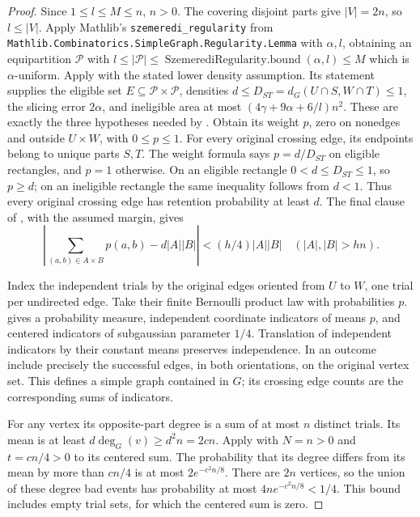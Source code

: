 \begin{proof}
Since $1\leq l\leq M\leq n$, $n>0$. The covering disjoint parts
give $|V|=2n$, so $l\leq|V|$. Apply
Mathlib's \texttt{szemeredi\_regularity} from
\texttt{Mathlib.Combinatorics.SimpleGraph.Regularity.Lemma} with $\alpha,l$, obtaining
an equipartition $\mathcal P$ with
$l\leq|\mathcal P|\leq\operatorname{SzemerediRegularity.bound}(\alpha,l)\leq M$
which is $\alpha$-uniform. Apply
 with the stated lower
density assumption. Its statement supplies the eligible set
$E\subseteq\mathcal P\times\mathcal P$, densities
$d\leq D_{ST}=d_G(U\cap S,W\cap T)\leq1$, the slicing error
$2\alpha$, and ineligible area at most $(4\gamma+9\alpha+6/l)n^2$.
These are exactly the three hypotheses needed by
. Obtain its weight $p$, zero
on nonedges and outside $U\times W$, with $0\leq p\leq1$.
For every original crossing edge, its endpoints belong to unique
parts $S,T$. The weight formula says $p=d/D_{ST}$ on eligible
rectangles, and $p=1$ otherwise. On an eligible rectangle
$0<d\leq D_{ST}\leq1$, so $p\geq d$; on an ineligible rectangle
the same inequality follows from $d<1$. Thus every original
crossing edge has retention probability at least $d$.
The final clause of , with
the assumed margin, gives
\[
\left|\sum_{(a,b)\in A\times B}p(a,b)-d|A||B|\right|
<(h/4)|A||B|\quad (|A|,|B|>hn).                 \tag{1}
\]

Index the independent trials by the original edges oriented from
$U$ to $W$, one trial per undirected edge. Take their finite
Bernoulli product law with probabilities $p$.
 gives a probability
measure, independent coordinate indicators of means $p$, and
centered indicators of subgaussian parameter $1/4$.
Translation of independent indicators by their constant means
preserves independence. In an outcome include precisely the
successful edges, in both orientations, on the original vertex
set. This defines a simple graph contained in $G$; its crossing
edge counts are the corresponding sums of indicators.

For any vertex its opposite-part degree is a sum of at most $n$
distinct trials. Its mean is at least
$d\deg_G(v)\geq d^2n=2cn$. Apply
 with $N=n>0$ and
$t=cn/4>0$ to its centered sum. The probability that its degree
differs from its mean by more than $cn/4$ is at most
$2e^{-c^2n/8}$. There are $2n$ vertices, so the union of these
degree bad events has probability at most $4ne^{-c^2n/8}<1/4$.
This bound includes empty trial sets, for which the centered
sum is zero.


\end{proof}
